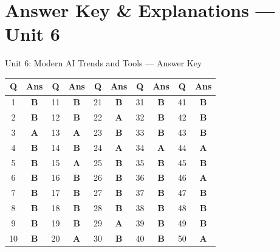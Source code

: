 
\newpage
\section{Answer Key \& Explanations --- Unit 6}

\begin{answerkeytable}{Unit 6: Modern AI Trends and Tools --- Answer Key}
\begin{tabular}{*{10}{c}}
\toprule
\textbf{Q} & \textbf{Ans} & \textbf{Q} & \textbf{Ans} & \textbf{Q} & \textbf{Ans} & \textbf{Q} & \textbf{Ans} & \textbf{Q} & \textbf{Ans} \\
\midrule
1 & \textbf{B} & 11 & \textbf{B} & 21 & \textbf{B} & 31 & \textbf{B} & 41 & \textbf{B} \\
2 & \textbf{B} & 12 & \textbf{B} & 22 & \textbf{A} & 32 & \textbf{B} & 42 & \textbf{B} \\
3 & \textbf{A} & 13 & \textbf{A} & 23 & \textbf{B} & 33 & \textbf{B} & 43 & \textbf{B} \\
4 & \textbf{B} & 14 & \textbf{B} & 24 & \textbf{A} & 34 & \textbf{A} & 44 & \textbf{A} \\
5 & \textbf{B} & 15 & \textbf{A} & 25 & \textbf{B} & 35 & \textbf{B} & 45 & \textbf{B} \\
6 & \textbf{B} & 16 & \textbf{B} & 26 & \textbf{B} & 36 & \textbf{B} & 46 & \textbf{A} \\
7 & \textbf{B} & 17 & \textbf{B} & 27 & \textbf{B} & 37 & \textbf{B} & 47 & \textbf{B} \\
8 & \textbf{B} & 18 & \textbf{B} & 28 & \textbf{B} & 38 & \textbf{B} & 48 & \textbf{B} \\
9 & \textbf{B} & 19 & \textbf{B} & 29 & \textbf{A} & 39 & \textbf{B} & 49 & \textbf{B} \\
10 & \textbf{B} & 20 & \textbf{A} & 30 & \textbf{B} & 40 & \textbf{B} & 50 & \textbf{A} \\
\bottomrule
\end{tabular}
\end{answerkeytable}

